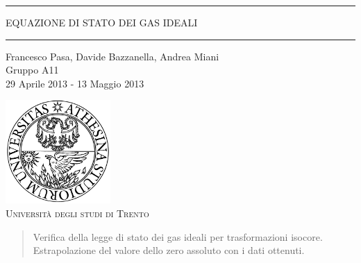 \begin{titlepage}
\begin{center}

	\hrule \vspace{0.5cm}
     	\textsc{\LARGE EQUAZIONE DI STATO DEI GAS IDEALI}
	\vspace{0.5cm} \hrule \vspace{2cm}

      	{\large Francesco Pasa, Davide Bazzanella, Andrea Miani\\
		Gruppo A11}\\
	\vspace{0.5cm}
      	{\large 29 Aprile 2013 - 13 Maggio 2013}
	\vfill

	\includegraphics[width=4cm]{unitn_logo.png}\\
	\vspace{1cm}
        \textsc{\Large Università degli studi di Trento}
	\vfill

	{\begin{abstract}
Verifica della legge di stato dei gas ideali per trasformazioni isocore.
Estrapolazione del valore dello zero assoluto con i dati ottenuti.
	 \end{abstract}}
\end{center}
\end{titlepage}
